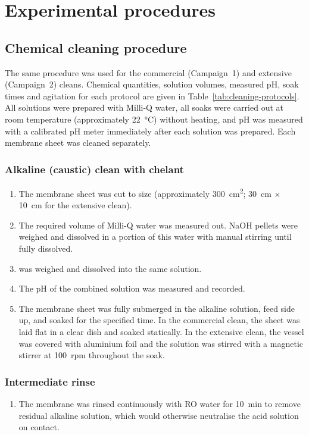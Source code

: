 \chapter{Experimental procedures}
\label{app:procedures}

\section{Chemical cleaning procedure}
\label{sec:cleaning-procedure}
The same procedure was used for the commercial (Campaign~1) and extensive (Campaign~2) cleans. Chemical quantities, solution volumes, measured pH, soak times and agitation for each protocol are given in Table~\ref{tab:cleaning-protocols}. All solutions were prepared with Milli-Q water, all soaks were carried out at room temperature (approximately \qty{22}{\degreeCelsius}) without heating, and pH was measured with a calibrated pH meter immediately after each solution was prepared. Each membrane sheet was cleaned separately.

\subsection*{Alkaline (caustic) clean with chelant}
\begin{enumerate}[nosep]
  \item The membrane sheet was cut to size (approximately \qty{300}{\square\centi\metre}; \qty{30}{\centi\metre} $\times$ \qty{10}{\centi\metre} for the extensive clean).
  \item The required volume of Milli-Q water was measured out. NaOH pellets were weighed and dissolved in a portion of this water with manual stirring until fully dissolved.
  \item {} was weighed and dissolved into the same solution.
  \item The pH of the combined solution was measured and recorded.
  \item The membrane sheet was fully submerged in the alkaline solution, feed side up, and soaked for the specified time. In the commercial clean, the sheet was laid flat in a clear dish and soaked statically. In the extensive clean, the vessel was covered with aluminium foil and the solution was stirred with a magnetic stirrer at \qty{100}{rpm} throughout the soak.
\end{enumerate}

\subsection*{Intermediate rinse}
\begin{enumerate}
  \item The membrane was rinsed continuously with RO water for \qty{10}{\minute} to remove residual alkaline solution, which would otherwise neutralise the acid solution on contact.
\end{enumerate}

